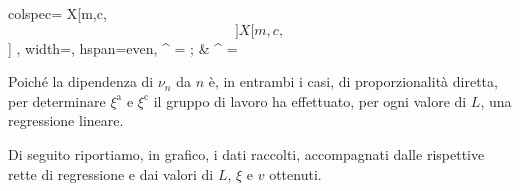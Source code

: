 \documentclass{article}
\newcommand*{\diam}{\varnothing}
\begin{document}
\begin{center}\begin{tblr}{
  colspec={ X[m,c,$$]X[m,c,$$] },
  width=\textwidth,
  hspan=even,
}
  \xi^ = \frac{v}{2L + 1.6 \diam};
  &
  \xi^ = \frac{v}{4L + 1.6 \diam}
\end{tblr}\end{center}

Poiché la dipendenza di $\nu_n$ da $n$ è, in entrambi i casi,
di proporzionalità diretta, per determinare $\xi^\text{a}$
e $\xi^\text{c}$ il gruppo di lavoro ha effettuato, per ogni
valore di $L$, una regressione lineare.

Di seguito riportiamo, in grafico, i dati raccolti, accompagnati
dalle rispettive rette di regressione e dai valori di $L$,
$\xi$ e $v$ ottenuti.

\begin{figure}[H]
  \centering
  \hfil
\end{figure}\begin{figure}[H]
  \centering
  \hfil

\end{figure}
\end{document}
